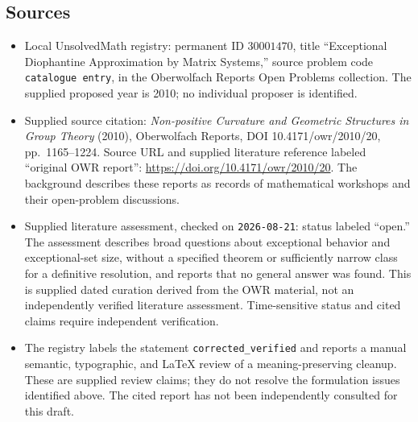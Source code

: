 \documentclass[11pt]{article}
\begin{document}
\subsection{Sources}
\begin{itemize}
\item Local UnsolvedMath registry: permanent ID \(30001470\), title ``Exceptional Diophantine Approximation by Matrix Systems,'' source problem code \texttt{catalogue entry}, in the Oberwolfach Reports Open Problems collection. The supplied proposed year is 2010; no individual proposer is identified.
\item Supplied source citation: \emph{Non-positive Curvature and Geometric Structures in Group Theory} (2010), Oberwolfach Reports, DOI 10.4171/owr/2010/20, pp.\ 1165--1224. Source URL and supplied literature reference labeled ``original OWR report'': \url{https://doi.org/10.4171/owr/2010/20}. The background describes these reports as records of mathematical workshops and their open-problem discussions.
\item Supplied literature assessment, checked on \texttt{2026-08-21}: status labeled ``open.'' The assessment describes broad questions about exceptional behavior and exceptional-set size, without a specified theorem or sufficiently narrow class for a definitive resolution, and reports that no general answer was found. This is supplied dated curation derived from the OWR material, not an independently verified literature assessment. Time-sensitive status and cited claims require independent verification.
\item The registry labels the statement \texttt{corrected\_verified} and reports a manual semantic, typographic, and LaTeX review of a meaning-preserving cleanup. These are supplied review claims; they do not resolve the formulation issues identified above. The cited report has not been independently consulted for this draft.
\end{itemize}
\end{document}
